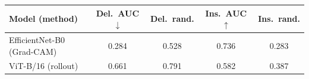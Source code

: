 \begin{tabular}{lcccc}
\toprule
Model (method) & Del.\ AUC $\downarrow$ & Del.\ rand. & Ins.\ AUC $\uparrow$ & Ins.\ rand. \\
\midrule
EfficientNet-B0 (Grad-CAM) & 0.284 & 0.528 & 0.736 & 0.283 \\
ViT-B/16 (rollout) & 0.661 & 0.791 & 0.582 & 0.387 \\
\bottomrule
\end{tabular}
